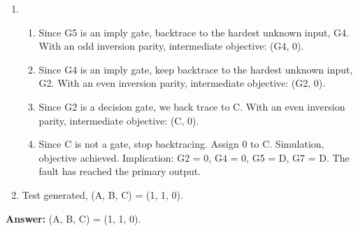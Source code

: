 \begin{enumerate}
{\begin{enumerate}
    \end{enumerate}
  }
  \item {
    \begin{enumerate}
      \item Since G5 is an imply gate, backtrace to the hardest unknown input, G4. With an odd inversion parity, intermediate objective: (G4, 0).
      \item Since G4 is an imply gate, keep backtrace to the hardest unknown input, G2. With an even inversion parity, intermediate objective: (G2, 0).
      \item Since G2 is a decision gate, we back trace to C. With an even inversion parity, intermediate objective: (C, 0).
      \item Since C is not a gate, stop backtracing. Assign 0 to C. Simulation, objective achieved. Implication: G2 = 0, G4 = 0, G5 = D, G7 = D. The fault has reached the primary output.
    \end{enumerate}
  }
  \item Test generated, (A, B, C) = (1, 1, 0).

\end{enumerate}

\textbf{Answer:} (A, B, C) = (1, 1, 0).

